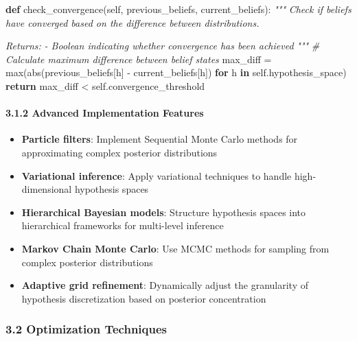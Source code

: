 \documentclass[
]{article}
\newenvironment{Shaded}{}{}
\newcommand{\BuiltInTok}[1]{\textcolor[rgb]{0.00,0.50,0.00}{#1}}
\newcommand{\CommentTok}[1]{\textcolor[rgb]{0.38,0.63,0.69}{\textit{#1}}}
\newcommand{\ControlFlowTok}[1]{\textcolor[rgb]{0.00,0.44,0.13}{\textbf{#1}}}
\newcommand{\KeywordTok}[1]{\textcolor[rgb]{0.00,0.44,0.13}{\textbf{#1}}}
\newcommand{\NormalTok}[1]{#1}
\newcommand{\OperatorTok}[1]{\textcolor[rgb]{0.40,0.40,0.40}{#1}}
\newcommand{\VariableTok}[1]{\textcolor[rgb]{0.10,0.09,0.49}{#1}}
\providecommand{\tightlist}{%
  \setlength{\itemsep}{0pt}\setlength{\parskip}{0pt}}
\begin{document}
\begin{Shaded}
\begin{Highlighting}[]
    \KeywordTok{def}\NormalTok{ check\_convergence(}\VariableTok{self}\NormalTok{, previous\_beliefs, current\_beliefs):}
        \CommentTok{"""}
\CommentTok{        Check if beliefs have converged based on the difference between distributions.}

\CommentTok{        Returns:}
\CommentTok{        {-} Boolean indicating whether convergence has been achieved}
\CommentTok{        """}
        \CommentTok{\# Calculate maximum difference between belief states}
\NormalTok{        max\_diff }\OperatorTok{=} \BuiltInTok{max}\NormalTok{(}\BuiltInTok{abs}\NormalTok{(previous\_beliefs[h] }\OperatorTok{{-}}\NormalTok{ current\_beliefs[h]) }\ControlFlowTok{for}\NormalTok{ h }\KeywordTok{in} \VariableTok{self}\NormalTok{.hypothesis\_space)}
        \ControlFlowTok{return}\NormalTok{ max\_diff }\OperatorTok{\textless{}} \VariableTok{self}\NormalTok{.convergence\_threshold}
\end{Highlighting}
\end{Shaded}

\paragraph{3.1.2 Advanced Implementation
Features}\label{advanced-implementation-features-1}

\begin{itemize}
\tightlist
\item
  \textbf{Particle filters}: Implement Sequential Monte Carlo methods
  for approximating complex posterior distributions
\item
  \textbf{Variational inference}: Apply variational techniques to handle
  high-dimensional hypothesis spaces
\item
  \textbf{Hierarchical Bayesian models}: Structure hypothesis spaces
  into hierarchical frameworks for multi-level inference
\item
  \textbf{Markov Chain Monte Carlo}: Use MCMC methods for sampling from
  complex posterior distributions
\item
  \textbf{Adaptive grid refinement}: Dynamically adjust the granularity
  of hypothesis discretization based on posterior concentration
\end{itemize}

\subsubsection{3.2 Optimization
Techniques}\label{optimization-techniques-1}
\end{document}
